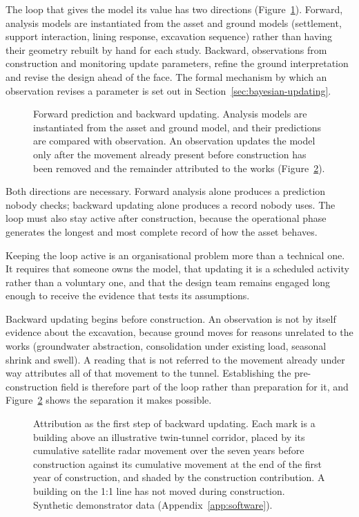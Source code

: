 The loop that gives the model its value has two directions
(Figure~\ref{fig:dt-update-loop}). Forward, analysis
models are instantiated from the asset and ground models (settlement,
support interaction, lining response, excavation sequence) rather than
having their geometry rebuilt by hand for each study. Backward, observations
from construction and monitoring update parameters, refine the ground
interpretation and revise the design ahead of the face. The formal mechanism
by which an observation revises a parameter is set out in
Section~\ref{sec:bayesian-updating}.

\begin{figure}[htbp]
\centering
{}
\caption{Forward prediction and backward updating. Analysis models are
instantiated from the asset and ground model, and their predictions are
compared with observation. An observation updates the model only after the
movement already present before construction has been removed and the
remainder attributed to the works (Figure~\ref{fig:movement-attribution}).}
\label{fig:dt-update-loop}
\end{figure}

Both directions are necessary. Forward analysis alone produces a prediction
nobody checks; backward updating alone produces a record nobody uses. The loop
must also stay active after construction, because the operational phase
generates the longest and most complete record of how the asset
behaves.

Keeping the loop active is an organisational problem more than a technical one. It
requires that someone owns the model, that updating it is a scheduled activity
rather than a voluntary one, and that the design team remains engaged long
enough to receive the evidence that tests its assumptions.

Backward updating begins before construction. An observation is not by
itself evidence about the excavation, because ground moves for reasons
unrelated to the works (groundwater abstraction, consolidation
under existing load, seasonal shrink and swell). A reading that is not
referred to the movement already under way attributes all of that movement
to the tunnel. Establishing the pre-construction field is therefore part of the
loop rather than preparation for it, and
Figure~\ref{fig:movement-attribution} shows the separation it makes possible.

\begin{figure}[htbp]
\centering
{}
\caption[Separating construction movement from movement already present]{%
Attribution as the first step of backward updating. Each mark is a building
above an illustrative twin-tunnel corridor, placed by its cumulative satellite
radar movement over the seven years before construction against its cumulative
movement at the end of the first year of construction, and shaded by the
construction contribution. A building on the 1:1 line has not moved during
construction. Synthetic demonstrator data (Appendix~\ref{app:software}).}
\label{fig:movement-attribution}
\end{figure}

